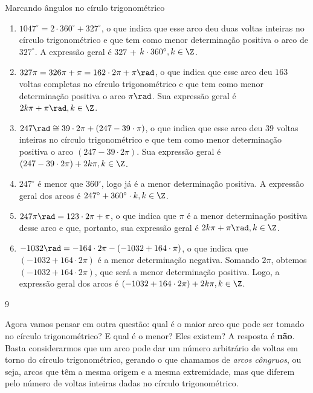 \begin{answer}{Marcando ângulos no círulo trigonométrico}
{
\begin{enumerate}
\item $1047^{\circ} = 2\cdot360^{\circ} + 327^{\circ}$, o que indica que esse arco deu duas voltas inteiras no círculo trigonométrico e que tem como menor determinação positiva  o arco de $327^{\circ}$. A expressão geral é $327$ + $k\cdot360^{\circ}, k\in \Z$.

\item $327\pi=326\pi+\pi=162\cdot2\pi+\pi\rad$, o que indica que esse arco deu $163$ voltas completas no círculo trigonométrico e que tem como menor determinação positiva o arco $\pi\rad$. Sua expressão geral é $2k\pi+\pi\rad, k\in\Z$.
\item $247\rad\cong39\cdot2\pi+(247-39\cdot\pi)$, o que indica que esse arco deu $39$ voltas inteiras no círculo trigonométrico e que tem como menor determinação positiva o arco $(247-39\cdot2\pi)$. Sua expressão geral é $(247-39\cdot2\pi)+2k\pi, k\in\Z$.
\item $247^{\circ}$ é menor que $360^{\circ}$, logo já é a menor determinação positiva. A expressão geral dos arcos é $247^{\circ}+360^{\circ}\cdot k, k\in\Z$.
\item $247\pi\rad=123\cdot2\pi+\pi$, o que indica que $\pi$ é a menor determinação positiva desse arco e que, portanto, sua expressão geral é $2k\pi+\pi\rad,k \in\Z$.
\item $-1032\rad=-164\cdot2\pi-(-1032+164\cdot\pi)$, o que indica que $(-1032+164\cdot2\pi)$ é a menor determinação negativa. Somando $2\pi$, obtemos $(-1032+164\cdot2\pi)$, que será a menor determinação positiva. Logo, a expressão geral dos arcos é $(-1032+164\cdot2\pi)+2k\pi,k\in\Z$.
\end{enumerate}
}{9}
\end{answer}
Agora vamos pensar em outra questão: qual é o maior arco que pode ser tomado no círculo  trigonométrico? E qual é o menor? Eles existem? A resposta é \textbf{não}. Basta considerarmos que um arco pode dar um número arbitrário de voltas em torno do círculo trigonométrico, gerando o que chamamos de \textit{arcos côngruos}, ou seja, arcos que têm a mesma origem e a mesma extremidade, mas que diferem pelo número de voltas inteiras dadas no círculo trigonométrico.

